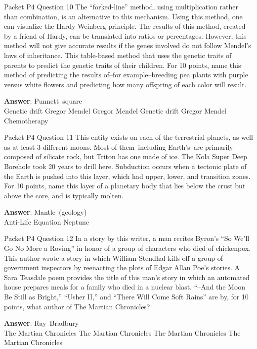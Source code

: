 \begin{frame}{Packet P4 Question 10}
The ``forked-line'' method, using multiplication rather than combination, is an alternative to this mechanism. Using this method, one can visualize the Hardy-Weinberg principle. The results of this method,   created by a friend of Hardy, can be translated into ratios or percentages. However, this method will not give accurate results if the genes involved do not follow Mendel's laws of inheritance. This table-based method that uses the genetic traits of parents to predict the genetic traits of their children. For 10 points, name this method of predicting the results of--for example--breeding pea plants   with purple versus white flowers and predicting how many offspring of each color will result.        

\textbf{Answer}: Punnett\ square\\
 Genetic drift
 Gregor Mendel
 Gregor Mendel
 Genetic drift
 Gregor Mendel
 Chemotherapy
\end{frame}

\begin{frame}{Packet P4 Question 11}
This entity exists on   each of the terrestrial planets, as well as at least 3 different moons. Most of them--including Earth's--are primarily composed of silicate rock, but Triton has   one made of ice. The Kola Super Deep Borehole took 20 years to drill here. Subduction occurs when a tectonic plate of the Earth is pushed into this layer, which   had upper, lower, and transition zones. For 10 points, name this layer of a planetary   body that lies below the crust but     above the core, and is typically molten.

\textbf{Answer}: Mantle\ (geology)\\
 Anti-Life Equation
 Neptune
\end{frame}

\begin{frame}{Packet P4 Question 12}
In a story by this writer, a man recites Byron’s “So We'll Go No More a Roving” in honor of a group of characters who died of chickenpox. This author wrote a story in which William Stendhal kills off a group of government inspectors by reenacting the plots of Edgar Allan Poe’s stories. A Sara Teasdale poem provides the title of this man’s story in which an automated house prepares     meals for a family who died in a nuclear blast. “--And the Moon Be Still as Bright,” “Usher II,” and   “There Will Come Soft Rains” are by,   for 10 points, what author of The Martian Chronicles?    

\textbf{Answer}: Ray\ Bradbury\\
 The Martian Chronicles
 The Martian Chronicles
 The Martian Chronicles
 The Martian Chronicles
\end{frame}

